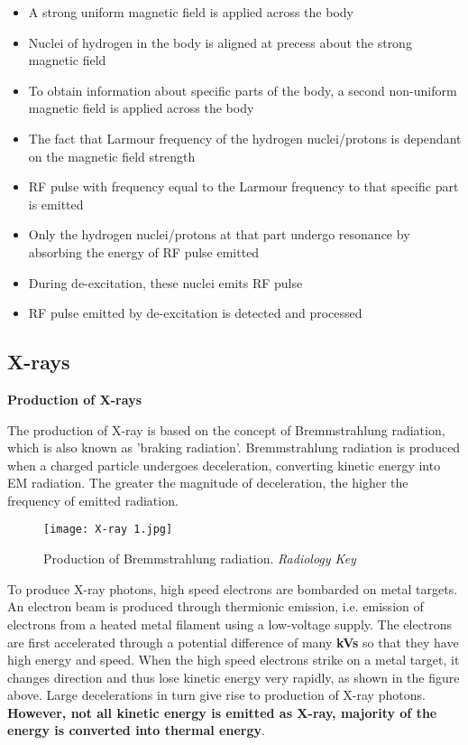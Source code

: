 \documentclass{article}
\begin{document}
\begin{tcolorbox}[colframe=black!20!white,title=\color{red}{****Explain the principles of MRI. (8m)}]
\begin{itemize}
\color{red}
    \item A strong uniform magnetic field is applied across the body
    \item Nuclei of hydrogen in the body is aligned at precess about the strong magnetic field
    \item To obtain information about specific parts of the body, a second non-uniform magnetic field is applied across the body
    \item The fact that Larmour frequency of the hydrogen nuclei/protons is dependant on the magnetic field strength
    \item RF pulse with frequency equal to the Larmour frequency to that specific part is emitted
    \item Only the hydrogen nuclei/protons at that part undergo resonance by absorbing the energy of RF pulse emitted
    \item During de-excitation, these nuclei emits RF pulse 
    \item RF pulse emitted by de-excitation is detected and processed

\end{itemize}
\end{tcolorbox}

\subsection{X-rays}

\begin{flushleft}
\textbf{Production of X-rays}
\end{flushleft}

The production of X-ray is based on the concept of Bremmstrahlung radiation, which is also known as 'braking radiation'. Bremmstrahlung radiation is produced when a charged particle undergoes deceleration, converting kinetic energy into EM radiation. The greater the magnitude of deceleration, the higher the frequency of emitted radiation.

\begin{figure}[H]
    \centering
    \texttt{[image: X-ray 1.jpg]}
    \caption*{Production of Bremmstrahlung radiation. \textit{Radiology Key}}
\end{figure}
    

To produce X-ray photons, high speed electrons are bombarded on metal targets. An electron beam is produced through thermionic emission, i.e. emission of electrons from a heated metal filament using a low-voltage supply. The electrons are first accelerated through a potential difference of many \textbf{kVs} so that they have high energy and speed. When the high speed electrons strike on a metal target, it changes direction and thus lose kinetic energy very rapidly, as shown in the figure above. Large decelerations in turn give rise to production of X-ray photons. \textbf{However, not all kinetic energy is emitted as X-ray, majority of the energy is converted into thermal energy}.
\end{document}
